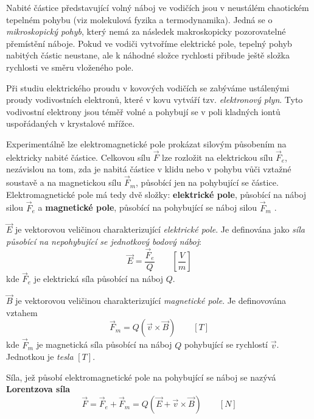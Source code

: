       Nabité částice představující volný náboj ve vodičích jsou v neustálém chaotickém tepelném
       pohybu (viz molekulová fyzika a termodynamika). Jedná se o \emph{mikroskopický pohyb}, který
       nemá za následek makroskopicky pozorovatelné přemístění náboje. Pokud ve vodiči vytvoříme
       elektrické pole, tepelný pohyb nabitých částic neustane, ale k náhodné složce rychlosti
       přibude ještě složka rychlosti ve směru vloženého pole.
       
       Při studiu elektrického proudu v kovových vodičích se zabýváme ustálenými proudy
       vodivostních elektronů, které v kovu vytváří tzv. \emph{elektronový plyn}. Tyto vodivostní
       elektrony jsou téměř volné a pohybují se v poli kladných iontů uspořádaných v krystalové
       mřížce.
        
       Experimentálně lze elektromagnetické pole prokázat silovým působením na elektricky nabité
       částice. Celkovou sílu $\vec{F}$ lze rozložit na elektrickou sílu $\vec{F}_e$, nezávislou na
       tom, zda je nabitá částice v klidu nebo v pohybu vůči vztažné soustavě a na magnetickou sílu
       $\vec{F}_m$, působící jen na pohybující se částice. Elektromagnetické pole má tedy dvě
       složky: \textbf{elektrické pole}, působící na náboj silou $\vec{F}_e$ a \textbf{magnetické
       pole}, působící na pohybující se náboj silou $\vec{F}_m$  \cite[s.~13]{Mayer2001}.
        
       $\vec{E}$ je vektorovou veličinou charakterizující
        \emph{elektrické pole}.
        Je definována jako 
        \emph{síla působící na nepohybující se jednotkový bodový náboj}:
        \begin{equation}\label{TEMP:eq_E}
          \vec{E} = \frac{\vec{F}_e}{Q} \qquad\left[\frac{V}{m}\right]  
        \end{equation}        
        kde $\vec{F}_e$ je elektrická síla působící na náboj $Q$.
                 
       $\vec{B}$ je vektorovou veličinou charakterizující \emph{magnetické
        pole}. Je definovována vztahem
        \begin{equation}\label{TEMP:eq_B}
          \vec{F}_m = Q(\vec{v}\times\vec{B}) \qquad[T]  
        \end{equation}        
        kde $\vec{F}_m$ je magnetická síla působící na náboj $Q$ pohybující se rychlostí $\vec{v}$.
        Jednotkou je \emph{tesla} $[T]$.
    
        Síla, jež působí elektromagnetické pole na pohybující se náboj se nazývá \textbf{Lorentzova
        síla}
         \begin{equation}\label{TEMP:eq_Lorentz}
          \vec{F} = \vec{F}_e + \vec{F}_m =Q(\vec{E} + \vec{v}\times\vec{B}) \qquad[N]  
        \end{equation}        

